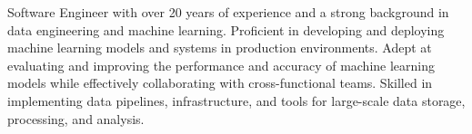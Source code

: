 \documentclass[10pt,a4paper,ragged2e,withhyper]{altacv}
\begin{document}


\makecvheader


Software Engineer with over 20 years of experience and a strong background in data engineering and machine learning. Proficient in developing and deploying machine learning models and systems in production environments. Adept at evaluating and improving the performance and accuracy of machine learning models while effectively collaborating with cross-functional teams. Skilled in implementing data pipelines, infrastructure, and tools for large-scale data storage, processing, and analysis.


\bigskip
{}
\end{document}
